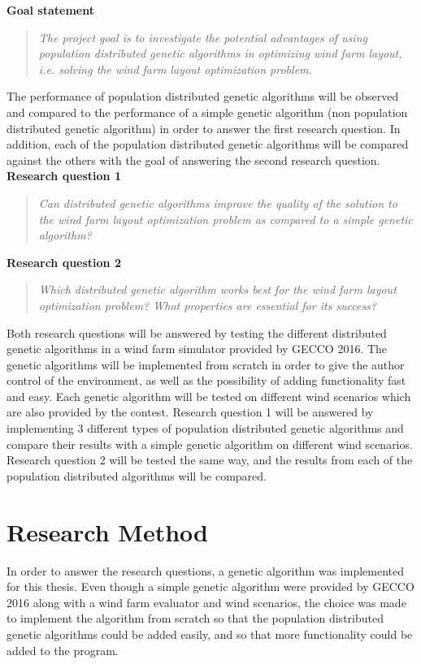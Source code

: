 \noindent \textbf{Goal statement}

\begin{quote}
\textit{The project goal is to investigate the potential advantages of using population distributed genetic algorithms in optimizing wind farm layout, i.e. solving the wind farm layout optimization problem.} \citep{Samorani}
\end{quote}

\noindent The performance of population distributed genetic algorithms will be observed and compared to the performance of a simple genetic algorithm (non population distributed genetic algorithm) in order to answer the first research question. In addition, each of the population distributed genetic algorithms will be compared against the others with the goal of answering the second research question. \\

\noindent \textbf{Research question 1}

\begin{quote}
\textit{Can distributed genetic algorithms improve the quality of the solution to the wind farm layout optimization problem as compared to a simple genetic algorithm?}
\end{quote}

\noindent \textbf{Research question 2}

\begin{quote}
\textit{Which distributed genetic algorithm works best for the wind farm layout optimization problem? What properties are essential for its success?}
\end{quote}

\noindent Both research questions will be answered by testing the different distributed genetic algorithms in a wind farm simulator provided by GECCO 2016. The genetic algorithms will be implemented from scratch in order to give the author control of the environment, as well as the possibility of adding functionality fast and easy. Each genetic algorithm will be tested on different wind scenarios which are also provided by the contest. Research question 1 will be answered by implementing 3 different types of population distributed genetic algorithms and compare their results with a simple genetic algorithm on different wind scenarios. Research question 2 will be tested the same way, and the results from each of the population distributed algorithms will be compared.


\section{Research Method}\label{section:researchmethod}
In order to answer the research questions, a genetic algorithm was implemented for this thesis. Even though a simple genetic algorithm were provided by GECCO 2016 along with a wind farm evaluator and wind scenarios, the choice was made to implement the algorithm from scratch so that the population distributed genetic algorithms could be added easily, and so that more functionality could be added to the program. \\

